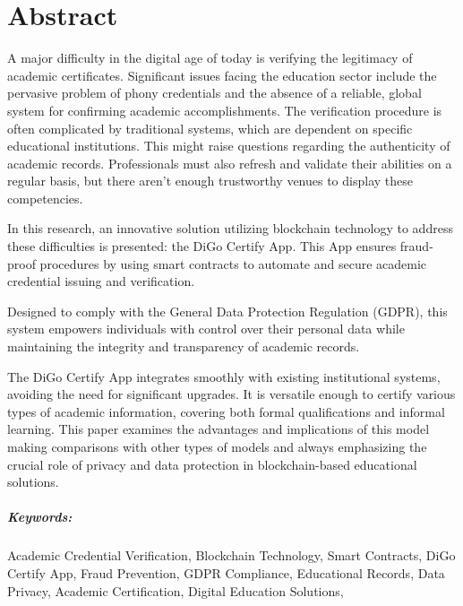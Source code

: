%
% 
\chapter*{Abstract}\label{chap:abstract}

A major difficulty in the digital age of today is verifying the legitimacy of academic certificates. Significant issues facing the education sector include the pervasive problem of phony credentials 
and the absence of a reliable, global system for confirming academic accomplishments. The verification procedure is often complicated by traditional systems, which are dependent on specific educational institutions. 
This might raise questions regarding the authenticity of academic records. Professionals must also refresh and validate their abilities on a regular basis, but there aren't enough trustworthy venues to display 
these competencies.

In this research, an innovative solution utilizing blockchain technology to address these difficulties is presented: the DiGo Certify App. This App ensures fraud-proof procedures by using smart contracts 
to automate and secure academic credential issuing and verification.

Designed to comply with the General Data Protection Regulation (GDPR), this system empowers individuals with control over their personal data while maintaining the integrity and transparency of academic records.

The DiGo Certify App integrates smoothly with existing institutional systems, avoiding the need for significant upgrades. It is versatile enough to certify various types of academic information, covering both formal qualifications and informal learning. 
This paper examines the advantages and implications of this model making comparisons with other types of models and always emphasizing the crucial role of privacy and data protection in blockchain-based educational solutions.

\paragraph{Keywords:} Academic Credential Verification, Blockchain Technology, Smart Contracts, DiGo Certify App, Fraud Prevention, GDPR Compliance, Educational Records, Data Privacy, Academic Certification, Digital Education Solutions,